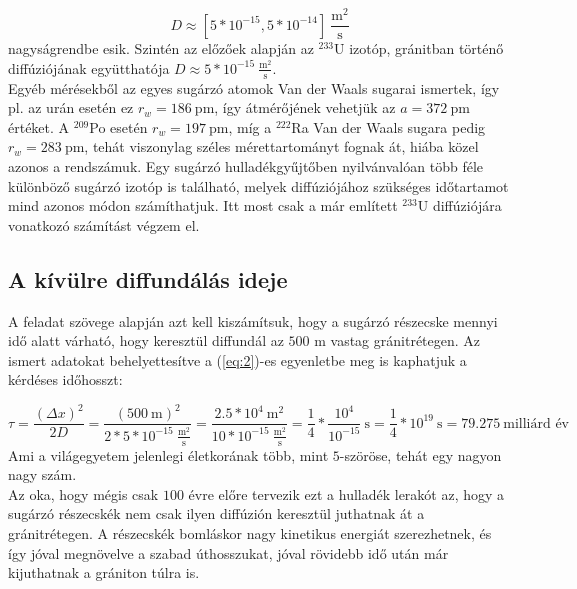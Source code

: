 \begin{equation} \label{eq:3}
    D
    \approx
    \left[ 5 * 10^{-15}, 5 * 10^{-14} \right]\ \frac{\text{m}^{2}}{\text{s}}
\end{equation}
nagyságrendbe esik\cite{idemitsu1991diffusivity}\cite{yamaguchi1997effective}. Szintén az előzőek alapján az $^{233}$U izotóp, gránitban történő diffúziójának együtthatója $D \approx 5 * 10^{-15}\ \frac{\text{m}^{2}}{\text{s}}$.\\
Egyéb mérésekből az egyes sugárzó atomok Van der Waals sugarai ismertek, így pl. az urán esetén ez $r_{w} = 186\ \text{pm}$, így átmérőjének vehetjük az $a = 372\ \text{pm}$ értéket\cite{bondi1964van}. A $^{209}$Po esetén $r_{w} = 197\ \text{pm}$, míg a $^{222}$Ra Van der Waals sugara pedig $r_{w} = 283\ \text{pm}$\cite{mantina2009consistent}, tehát viszonylag széles mérettartományt fognak át, hiába közel azonos a rendszámuk. Egy sugárzó hulladékgyűjtőben nyilvánvalóan több féle különböző sugárzó izotóp is található, melyek diffúziójához szükséges időtartamot mind azonos módon számíthatjuk. Itt most csak a már említett $^{233}$U diffúziójára vonatkozó számítást végzem el.

\subsection{A kívülre diffundálás ideje}
A feladat szövege alapján azt kell kiszámítsuk, hogy a sugárzó részecske mennyi idő alatt várható, hogy keresztül diffundál az $500$ m vastag gránitrétegen. Az ismert adatokat behelyettesítve a (\ref{eq:2})-es egyenletbe meg is kaphatjuk a kérdéses időhosszt:

\begin{equation}
    \tau
    =
    \frac{\left( \Delta x \right)^{2}}{2D}
    =
    \frac{\left( 500\ \text{m} \right)^{2}}{2 * 5 * 10^{-15}\ \frac{\text{m}^{2}}{\text{s}}}
    =
    \frac{2.5 * 10^{4}\ \text{m}^{2}}{10 * 10^{-15}\ \frac{\text{m}^{2}}{\text{s}}}
    =
    \frac{1}{4} * \frac{10^{4}}{10^{-15}}\ \text{s}
    =
    \frac{1}{4} * 10^{19}\ \text{s}
    =
    79.275\ \text{milliárd év}
\end{equation}
Ami a világegyetem jelenlegi életkorának több, mint $5$-szöröse, tehát egy nagyon nagy szám.\\
Az oka, hogy mégis csak $100$ évre előre tervezik ezt a hulladék lerakót az, hogy a sugárzó részecskék nem csak ilyen diffúzión keresztül juthatnak át a gránitrétegen. A részecskék bomláskor nagy kinetikus energiát szerezhetnek, és így jóval megnövelve a szabad úthosszukat, jóval rövidebb idő után már kijuthatnak a grániton túlra is.